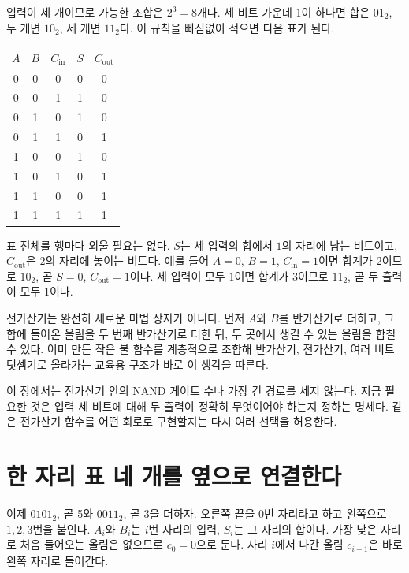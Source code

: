 입력이 세 개이므로 가능한 조합은 \(2^3=8\)개다. 세 비트 가운데 \(1\)이 하나면 합은 \(01_2\), 두 개면 \(10_2\), 세 개면 \(11_2\)다. 이 규칙을 빠짐없이 적으면 다음 표가 된다.

\begin{center}
\small
\begin{tabular}{ccccc}
\toprule
\sffamily\bfseries \(A\) & \sffamily\bfseries \(B\) & \sffamily\bfseries \(C_{\mathrm{in}}\) & \sffamily\bfseries \(S\) & \sffamily\bfseries \(C_{\mathrm{out}}\) \\
\midrule
0 & 0 & 0 & 0 & 0 \\
0 & 0 & 1 & 1 & 0 \\
0 & 1 & 0 & 1 & 0 \\
0 & 1 & 1 & 0 & 1 \\
1 & 0 & 0 & 1 & 0 \\
1 & 0 & 1 & 0 & 1 \\
1 & 1 & 0 & 0 & 1 \\
1 & 1 & 1 & 1 & 1 \\
\bottomrule
\end{tabular}
\end{center}

표 전체를 행마다 외울 필요는 없다. \(S\)는 세 입력의 합에서 \(1\)의 자리에 남는 비트이고, \(C_{\mathrm{out}}\)은 \(2\)의 자리에 놓이는 비트다. 예를 들어 \(A=0\), \(B=1\), \(C_{\mathrm{in}}=1\)이면 합계가 2이므로 \(10_2\), 곧 \(S=0\), \(C_{\mathrm{out}}=1\)이다. 세 입력이 모두 \(1\)이면 합계가 3이므로 \(11_2\), 곧 두 출력이 모두 \(1\)이다.

전가산기는 완전히 새로운 마법 상자가 아니다. 먼저 \(A\)와 \(B\)를 반가산기로 더하고, 그 합에 들어온 올림을 두 번째 반가산기로 더한 뒤, 두 곳에서 생길 수 있는 올림을 합칠 수 있다. 이미 만든 작은 불 함수를 계층적으로 조합해 반가산기, 전가산기, 여러 비트 덧셈기로 올라가는 교육용 구조가 바로 이 생각을 따른다\parencite{nand2tetrisproject2}.

이 장에서는 전가산기 안의 NAND 게이트 수나 가장 긴 경로를 세지 않는다. 지금 필요한 것은 입력 세 비트에 대해 두 출력이 정확히 무엇이어야 하는지 정하는 명세다. 같은 전가산기 함수를 어떤 회로로 구현할지는 다시 여러 선택을 허용한다.

\section{한 자리 표 네 개를 옆으로 연결한다}

이제 \(0101_2\), 곧 5와 \(0011_2\), 곧 3을 더하자. 오른쪽 끝을 0번 자리라고 하고 왼쪽으로 \(1,2,3\)번을 붙인다. \(A_i\)와 \(B_i\)는 \(i\)번 자리의 입력, \(S_i\)는 그 자리의 합이다. 가장 낮은 자리로 처음 들어오는 올림은 없으므로 \(c_0=0\)으로 둔다. 자리 \(i\)에서 나간 올림 \(c_{i+1}\)은 바로 왼쪽 자리로 들어간다.

